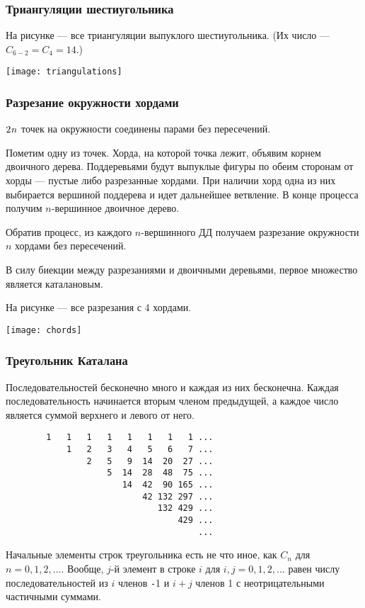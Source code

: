\documentclass[mathserif]{beamer}
\begin{document}
\begin{frame}[fragile]%
\frametitle{Триангуляции шестиугольника}
На рисунке — все триангуляции выпуклого шестиугольника.
(Их число — $C_{6-2}=C_4=14.$)

\bigskip\bigskip\bigskip

\centerline{\texttt{[image: triangulations]}}
\end{frame}

\begin{frame}[fragile]%
\frametitle{Разрезание окружности хордами}
\begin{spacing}{.8}
$2\kern.1ex{}n$ точек на окружности соединены парами без пересечений.

\medskip

Пометим одну из точек.
Хорда, на которой точка лежит, объявим корнем двоичного дерева.
Поддеревьями будут выпуклые фигуры по обеим сторонам от хорды — пустые либо разрезанные хордами.
При наличии хорд одна из них выбирается вершиной поддерева и идет дальнейшее ветвление.
В конце процесса получим $n$-вершинное двоичное дерево.

\medskip

Обратив процесс, из каждого $n$-вершинного ДД получаем разрезание окружности $n$ хордами без пересечений.

\medskip

В силу биекции между разрезаниями и двоичными деревьями, первое множество является каталановым.

\medskip

На рисунке — все разрезания с 4 хордами.
\end{spacing}

\bigskip

\centerline{\texttt{[image: chords]}}
\end{frame}

\begin{frame}[fragile]%
\frametitle{Треугольник Каталана}
Последовательностей бесконечно много и каждая из них бесконечна.
Каждая последовательность начинается вторым членом предыдущей, а каждое число является суммой верхнего и левого от него.
{\small\begin{verbatim}
        1   1   1   1   1   1   1   1 ...
            1   2   3   4   5   6   7 ...
                2   5   9  14  20  27 ...
                    5  14  28  48  75 ...
                       14  42  90 165 ...
                           42 132 297 ...
                              132 429 ...
                                  429 ...
                                      ...
\end{verbatim}}
Начальные элементы строк треугольника есть не что иное, как $C_n$ для $n=0,1,2,\dots$.
Вообще, $j$-й элемент в строке $i$ для $i,j=0,1,2,\dots$ равен числу последовательностей из 
$i$ членов \texttt{-}$\!$1 и $i{+}j$ членов 1 с неотрицательными частичными суммами.
\end{frame}
\end{document}
